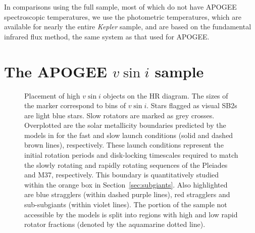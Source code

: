 \documentclass[preprint2]{aastex62}
\newcommand{\vsini}{\ensuremath{v \sin i}}
\newcommand{\Kepler}{\mbox{\textit{Kepler}}}
\begin{document}
In comparisons using the full \citet{McQuillan14} sample, most of which do not 
have APOGEE spectroscopic temperatures, we use the
\citet{Berger18b} photometric temperatures, which are available for nearly the
entire \Kepler{} sample, and are based on the fundamental infrared flux method,
the same system as that used for APOGEE.

\section{The APOGEE \vsini{} sample}
\label{sec:validation}

\begin{figure}[htb]
    \centering
    \caption{Placement of high \vsini{} objects on the HR diagram. The sizes of
    the marker correspond to bins of \vsini{}. Stars flagged as
visual SB2s are light blue stars. Slow rotators are marked as grey crosses.
Overplotted are the solar metallicity boundaries predicted by the models in
\citet{vanSaders13} for the fast and slow launch conditions (solid and dashed
brown lines), respectively. These launch conditions represent the initial rotation periods and disk-locking timescales required to match the slowly rotating and rapidly rotating sequences of the Pleiades and M37, respectively. This boundary is quantitatively studied within the
orange box in Section~\ref{sec:subgiants}. Also highlighted are blue stragglers 
(within dashed purple lines), red stragglers and sub-subgiants (within violet 
lines). The portion of the sample not accessible by the \citet{vanSaders13} 
models is split into regions with high and low rapid rotator fractions (denoted 
    by the aquamarine dotted line).}
    \label{fig:rawdata}
\end{figure}
\end{document}
